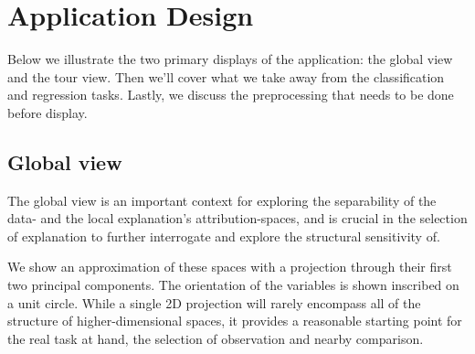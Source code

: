 \documentclass[
]{article}
\begin{document}
\hypertarget{sec:applicationdesign}{%
\section{Application Design}\label{sec:applicationdesign}}

Below we illustrate the two primary displays of the application: the global view and the tour view. Then we'll cover what we take away from the classification and regression tasks. Lastly, we discuss the preprocessing that needs to be done before display.

\hypertarget{global-view}{%
\subsection{Global view}\label{global-view}}

The global view is an important context for exploring the separability of the data- and the local explanation's attribution-spaces, and is crucial in the selection of explanation to further interrogate and explore the structural sensitivity of.

We show an approximation of these spaces with a projection through their first two principal components. The orientation of the variables is shown inscribed on a unit circle. While a single 2D projection will rarely encompass all of the structure of higher-dimensional spaces, it provides a reasonable starting point for the real task at hand, the selection of observation and nearby comparison.
\end{document}
